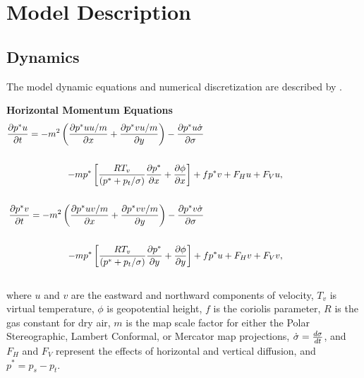\newpage
\section{Model Description}

\subsection{Dynamics}
The model dynamic equations and numerical discretization are described by
\cite{Grell_94}.

\noindent
{\bf Horizontal Momentum Equations}
\begin{eqnarray}
\nonumber
{\partial{p^{\ast}u} \over \partial{t}} = -m^2 \left( {\partial{p^{\ast}uu/m} 
\over \partial{x}} + {\partial{p^{\ast}vu/m} \over \partial{y}} \right) -
{\partial{p^{\ast}u \dot{\sigma}} \over \partial{\sigma}}  \hspace{6cm} \\ \nonumber
\\ 
- m p^{\ast} \left[ {RT_v \over ({p^{\ast} + p_t/\sigma)}} {\partial{p^{\ast}} \over 
\partial{x}} + {\partial{\phi} \over \partial{x}} \right] + 
fp^{\ast}v + F_Hu + F_Vu, \hspace{3cm} \\\nonumber 
\\ \nonumber
{\partial{p^{\ast}v} \over \partial{t}} = -m^2 \left( {\partial{p^{\ast}uv/m} 
\over \partial{x}} + {\partial{p^{\ast}vv/m} \over \partial{y}} \right) - 
{\partial{p^{\ast}v \dot{\sigma}} \over \partial{\sigma}}  \hspace{6cm} \\ \nonumber 
\\
- m p^{\ast} \left[ {RT_v \over ({p^{\ast} + p_t/\sigma)}} {\partial{p^{\ast}} \over 
\partial{y}} + {\partial{\phi} \over \partial{y}} \right] + 
fp^{\ast}u + F_Hv + F_Vv, \hspace{3cm} \\ \nonumber 
\end{eqnarray} 
\noindent
where $u$ and $v$ are the eastward and northward components of velocity, $T_v$ is 
virtual temperature, $\phi$ is geopotential height, $f$ is the coriolis parameter, $R$
is the gas constant for dry air, $m$ is the map scale factor for either the Polar
Stereographic, Lambert Conformal, or Mercator map projections, $\dot{\sigma} = 
{d\sigma \over dt}$, and $F_H$ and $F_V$ represent the effects of horizontal and 
vertical diffusion, and $p^{\ast}=p_s-p_t$.
\\

